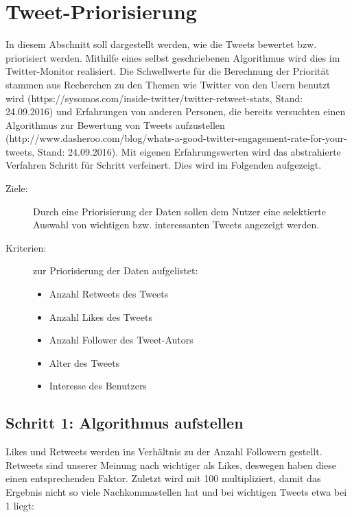 \section{Tweet-Priorisierung}

In diesem Abschnitt soll dargestellt werden, wie die Tweets bewertet bzw. priorisiert 
werden. Mithilfe eines selbst geschriebenen Algorithmus wird dies im Twitter-Monitor 
realisiert. Die Schwellwerte für die Berechnung der Priorität stammen aus Recherchen zu den Themen wie Twitter von den Usern benutzt wird (https://sysomos.com/inside-twitter/twitter-retweet-stats, Stand: 24.09.2016) und Erfahrungen von anderen Personen, die bereits versuchten einen Algorithmus zur Bewertung von Tweets aufzustellen (http://www.dasheroo.com/blog/whats-a-good-twitter-engagement-rate-for-your-tweets, Stand: 24.09.2016). Mit eigenen Erfahrungswerten wird das abstrahierte Verfahren Schritt für Schritt verfeinert. Dies wird im Folgenden aufgezeigt.
\begin{description}
	\item [Ziele:] Durch eine Priorisierung der Daten sollen dem Nutzer eine selektierte Auswahl von wichtigen bzw. interessanten Tweets angezeigt werden. 
	\item [Kriterien:] zur Priorisierung der Daten aufgelistet:
	\begin{itemize}
		\item Anzahl Retweets des Tweets 
		\item Anzahl Likes des Tweets
		\item Anzahl Follower des Tweet-Autors
		\item Alter des Tweets
		\item Interesse des Benutzers
	\end{itemize}
\end{description}

\subsection*{Schritt 1: Algorithmus aufstellen}

Likes und Retweets werden ins Verhältnis zu der Anzahl Followern gestellt. Retweets sind 
unserer Meinung nach wichtiger als Likes, deswegen haben diese einen entsprechenden 
Faktor. Zuletzt wird mit 100 multipliziert, damit das Ergebnis nicht so viele 
Nachkommastellen hat und bei wichtigen Tweets etwa bei 1 liegt:

